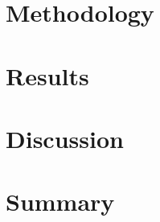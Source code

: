 \documentclass[10pt,conference,compsocconf]{IEEEtran}
\begin{document}
\section{Methodology}

\section{Results}

\section{Discussion}

\section{Summary}

%






\end{document}
